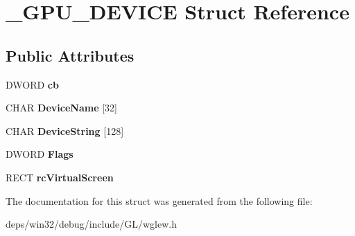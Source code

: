 \hypertarget{struct___g_p_u___d_e_v_i_c_e}{}\section{\+\_\+\+G\+P\+U\+\_\+\+D\+E\+V\+I\+C\+E Struct Reference}
\label{struct___g_p_u___d_e_v_i_c_e}
\subsection*{Public Attributes}
\begin{DoxyCompactItemize}
\item 
\hypertarget{struct___g_p_u___d_e_v_i_c_e_afcb22f16ba9e526610489ff56ab78ddb}{}D\+W\+O\+R\+D {\bfseries cb}\label{struct___g_p_u___d_e_v_i_c_e_afcb22f16ba9e526610489ff56ab78ddb}

\item 
\hypertarget{struct___g_p_u___d_e_v_i_c_e_a604bfab61f1a2c5d1e635837d369ba14}{}C\+H\+A\+R {\bfseries Device\+Name} \mbox{[}32\mbox{]}\label{struct___g_p_u___d_e_v_i_c_e_a604bfab61f1a2c5d1e635837d369ba14}

\item 
\hypertarget{struct___g_p_u___d_e_v_i_c_e_aff8b7920ccc85afcd6f325da6cdb0b73}{}C\+H\+A\+R {\bfseries Device\+String} \mbox{[}128\mbox{]}\label{struct___g_p_u___d_e_v_i_c_e_aff8b7920ccc85afcd6f325da6cdb0b73}

\item 
\hypertarget{struct___g_p_u___d_e_v_i_c_e_a008db9d0f5fc13a5160805f40465f14a}{}D\+W\+O\+R\+D {\bfseries Flags}\label{struct___g_p_u___d_e_v_i_c_e_a008db9d0f5fc13a5160805f40465f14a}

\item 
\hypertarget{struct___g_p_u___d_e_v_i_c_e_aeb573bbeb3b6c589246720ef259b9a27}{}R\+E\+C\+T {\bfseries rc\+Virtual\+Screen}\label{struct___g_p_u___d_e_v_i_c_e_aeb573bbeb3b6c589246720ef259b9a27}

\end{DoxyCompactItemize}


The documentation for this struct was generated from the following file\+:\begin{DoxyCompactItemize}
\item 
deps/win32/debug/include/\+G\+L/wglew.\+h\end{DoxyCompactItemize}
